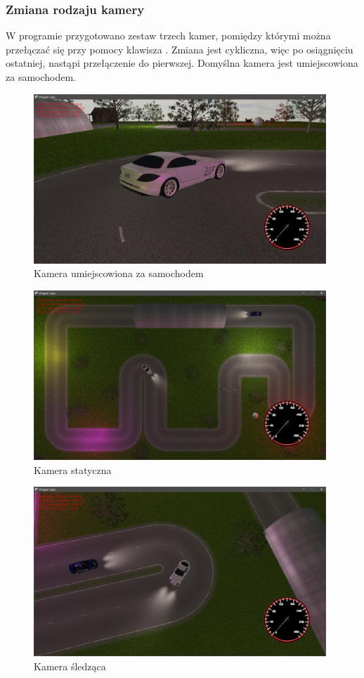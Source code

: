 \documentclass[10pt,a4paper]{article}
\begin{document}
\subsubsection{Zmiana rodzaju kamery}
W programie przygotowano zestaw trzech kamer, pomiędzy którymi można przełączać się przy pomocy klawisza . Zmiana jest cykliczna, więc po osiągnięciu ostatniej, nastąpi przełączenie do pierwszej. Domyślna kamera jest umiejscowiona za samochodem.
\begin{figure}[H]
  \centering
  \includegraphics[width=11cm]{Resources/Images/cam_car.png}
  \caption{Kamera umiejscowiona za samochodem}
\end{figure}
\begin{figure}[H]
  \centering
  \includegraphics[width=11cm]{Resources/Images/cam_static.png}
  \caption{Kamera statyczna}
\end{figure}
\begin{figure}[H]
  \centering
  \includegraphics[width=11cm]{Resources/Images/cam_follow.png}
  \caption{Kamera śledząca}
\end{figure}
\end{document}
